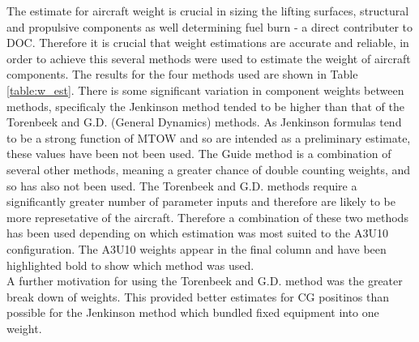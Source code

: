 \documentclass[11pt]{article}
\begin{document}
The estimate for aircraft weight is crucial in sizing the lifting surfaces, structural and propulsive components as well determining fuel burn - a direct contributer to DOC. Therefore it is crucial that weight estimations are accurate and reliable, in order to achieve this several methods were used to estimate the weight of aircraft components. The results for the four methods used are shown in Table \ref{table:w_est}. There is some significant variation in component weights between methods, specificaly the Jenkinson \cite{jenk} method tended to be higher than that of the Torenbeek \cite{tbeek} and G.D. (General Dynamics) \cite{R5} methods. As Jenkinson formulas tend to be a strong function of MTOW and so are intended as a preliminary estimate, these values have been not been used. The Guide method \cite{guide} is a combination of several other methods, meaning a greater chance of double counting weights, and so has also not been used. The Torenbeek and G.D. methods require a significantly greater number of parameter inputs and therefore are likely to be more represetative of the aircraft. Therefore a combination of these two methods has been used depending on which estimation was most suited to the A3U10 configuration. The A3U10 weights appear in the final column and have been highlighted bold to show which method was used.\\
A further motivation for using the Torenbeek and G.D. method was the greater break down of weights. This provided better estimates for CG positinos than possible for the Jenkinson method which bundled fixed equipment into one weight. 
\end{document}
